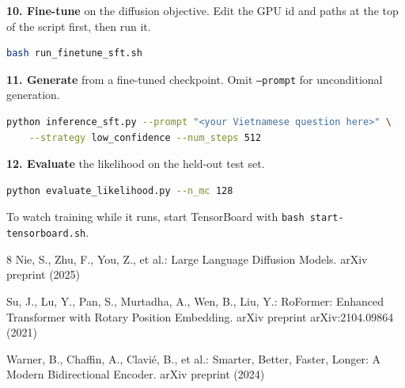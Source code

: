 \documentclass{llncs}
\begin{document}
\noindent\textbf{10. Fine-tune} on the diffusion objective. Edit the GPU id and paths at the top
of the script first, then run it.
\begin{lstlisting}[language=bash]
bash run_finetune_sft.sh
\end{lstlisting}

\noindent\textbf{11. Generate} from a fine-tuned checkpoint. Omit \texttt{--prompt} for
unconditional generation.
\begin{lstlisting}[language=bash]
python inference_sft.py --prompt "<your Vietnamese question here>" \
    --strategy low_confidence --num_steps 512
\end{lstlisting}

\noindent\textbf{12. Evaluate} the likelihood on the held-out test set.
\begin{lstlisting}[language=bash]
python evaluate_likelihood.py --n_mc 128
\end{lstlisting}

\medskip
\noindent To watch training while it runs, start TensorBoard with
\texttt{bash start-tensorboard.sh}.

\begin{thebibliography}{8}
Nie, S., Zhu, F., You, Z., et al.: Large Language Diffusion Models. arXiv preprint (2025)

Su, J., Lu, Y., Pan, S., Murtadha, A., Wen, B., Liu, Y.: RoFormer: Enhanced Transformer with
Rotary Position Embedding. arXiv preprint arXiv:2104.09864 (2021)

Warner, B., Chaffin, A., Clavié, B., et al.: Smarter, Better, Faster, Longer: A Modern
Bidirectional Encoder. arXiv preprint (2024)
\end{thebibliography}
\end{document}

